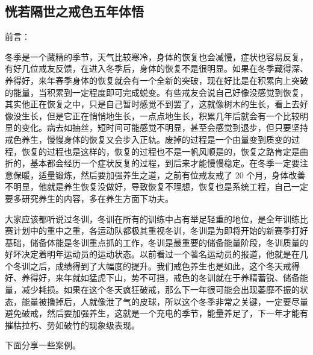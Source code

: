 \subsection{恍若隔世之戒色五年体悟}

前言：

冬季是一个藏精的季节，天气比较寒冷，身体的恢复也会减慢，症状也容易反复，有好几位戒友反馈，在进入冬季后，身体的恢复不是很明显。如果在冬季藏得深、养得好，来年春季身体的恢复就会有一个全新的突破，现在好比是在积累向上突破的能量，当积累到一定程度即可完成蜕变。有些戒友会说自己好像没感觉到恢复，其实他正在恢复之中，只是自己暂时感觉不到罢了，这就像树木的生长，看上去好像没生长，但是它正在悄悄地生长，一点点地生长，积累几年后就会有一个比较明显的变化。病去如抽丝，短时间可能感觉不明显，甚至会感觉到退步，但只要坚持戒色养生，慢慢身体的恢复又会步入正轨。废掉的过程是一个由量变到质变的过程，恢复的过程也是这样的，恢复的过程也不是一帆风顺是的，恢复之路肯定是曲折的，基本都会经历一个症状反复的过程，到后来才能慢慢稳定。在冬季一定要注意保暖，适量锻炼，然后要加强养生之道，之前有位戒友戒了 20 个月，身体改善不明显，他就是养生恢复没做好，导致恢复不理想，恢复也是系统工程，自己一定要多研究养生的内容，多在养生方面下功夫。

大家应该都听说过冬训，冬训在所有的训练中占有举足轻重的地位，是全年训练比赛计划中的重中之重，各运动队都极其重视冬训，冬训是为即将开始的新赛季打好基础，储备体能是冬训重点抓的工作，冬训是最重要的储备能量阶段，冬训质量的好坏决定着明年运动员的运动状态。以前看过一个著名运动员的报道，他就是在几个冬训之后，成绩得到了大幅度的提升。我们戒色养生也是如此，这个冬天戒得好、养得好，来年就如猛虎下山，势不可挡，戒色的冬训就在于养精蓄锐、储备能量，减少耗损。如果在这个冬天疯狂破戒，那么下一年很可能会出现萎靡不振的状态，能量被撸掉后，人就像泄了气的皮球，所以这个冬季非常之关键，一定要尽量避免破戒，然后要加强养生，这就是一个充电的季节，能量养足了，下一年才能有摧枯拉朽、势如破竹的现象级表现。

下面分享一些案例。

